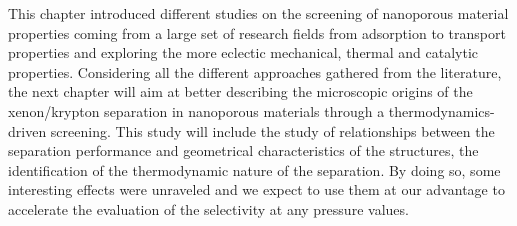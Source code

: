 \documentclass[main.tex]{subfiles}
\begin{document}
\vspace{1cm}

This chapter introduced different studies on the screening of nanoporous material properties coming from a large set of research fields from adsorption to transport properties and exploring the more eclectic mechanical, thermal and catalytic properties. Considering all the different approaches gathered from the literature, the next chapter will aim at better describing the microscopic origins of the xenon/krypton separation in nanoporous materials through a thermodynamics-driven screening. This study will include the study of relationships between the separation performance and geometrical characteristics of the structures, the identification of the thermodynamic nature of the separation. By doing so, some interesting effects were unraveled and we expect to use them at our advantage to accelerate the evaluation of the selectivity at any pressure values.

\OnlyInSubfile{\printglobalbibliography}
\end{document}
